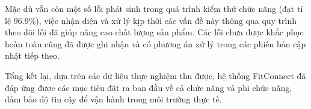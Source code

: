 Mặc dù vẫn còn một số lỗi phát sinh trong quá trình kiểm thử chức năng (đạt tỉ lệ 96.9\%), việc nhận diện và xử lý kịp thời các vấn đề này thông qua quy trình theo dõi lỗi đã giúp nâng cao chất lượng sản phẩm. Các lỗi chưa được khắc phục hoàn toàn cũng đã được ghi nhận và có phương án xử lý trong các phiên bản cập nhật tiếp theo.

Tổng kết lại, dựa trên các dữ liệu thực nghiệm thu được, hệ thống FitConnect đã đáp ứng được các mục tiêu đặt ra ban đầu về cả chức năng và phi chức năng, đảm bảo độ tin cậy để vận hành trong môi trường thực tế.

